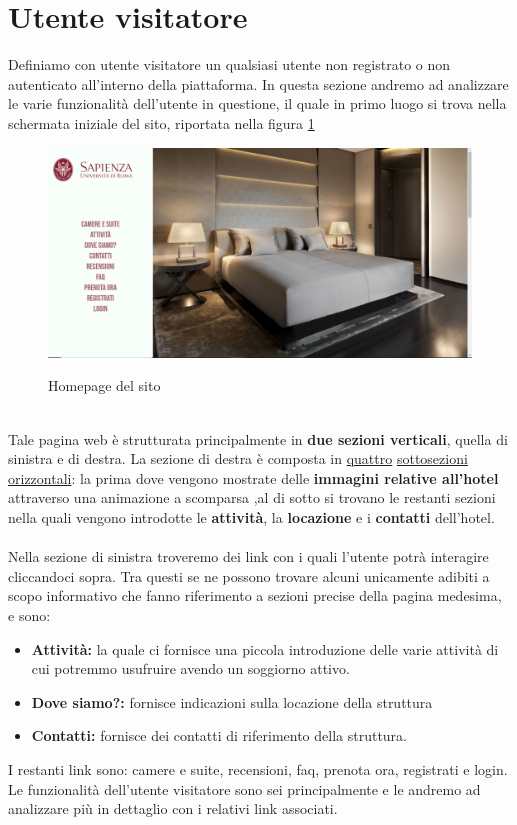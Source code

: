 \documentclass [a4paper, 12pt]{book}
\begin{document}
\section{Utente visitatore}
Definiamo con utente visitatore un qualsiasi utente non registrato o non autenticato all'interno della piattaforma. In questa sezione andremo ad analizzare le varie funzionalità dell'utente in questione, il quale in primo luogo si trova nella schermata iniziale del sito, riportata nella figura \ref{intro}
\begin{figure}[h]
\centering
\includegraphics[scale=0.3]{HomePage.png}
\label{intro}
\caption{Homepage del sito}
\end{figure}\\
Tale pagina web è strutturata principalmente in \textbf{due sezioni verticali}, quella di sinistra e di destra. La sezione di destra è composta in \underline{quattro} \underline{sottosezioni orizzontali}: la prima dove vengono mostrate delle \textbf{immagini relative all'hotel} attraverso una animazione a scomparsa ,al di sotto si trovano le restanti sezioni nella quali vengono introdotte le \textbf{attività}, la \textbf{locazione} e i \textbf{contatti} dell'hotel.\\\\
Nella sezione di sinistra troveremo dei link con i quali l’utente potrà interagire cliccandoci sopra. Tra questi se ne possono trovare alcuni unicamente adibiti a scopo informativo che fanno riferimento a sezioni precise della pagina medesima, e sono: 
\begin{itemize}
\item \textbf{Attività:} la quale ci fornisce una piccola introduzione delle varie attività di cui potremmo usufruire avendo un soggiorno attivo.
\item \textbf{Dove siamo?:} fornisce indicazioni sulla locazione della struttura
\item \textbf{Contatti:} fornisce dei contatti di riferimento della struttura. 
\end{itemize}
I restanti link sono: camere e suite,  recensioni, faq, prenota ora, registrati e login. Le funzionalità dell'utente visitatore sono sei principalmente e le andremo ad analizzare più in dettaglio con i relativi link associati.
\end{document}
